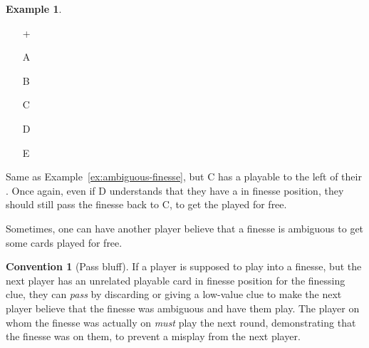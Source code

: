 \documentclass[a4paper]{article}
\theoremstyle{plain}
\theoremstyle{definition}
\newtheorem{example}[theorem]{Example}
\newtheorem{convention}[theorem]{Convention}
\begin{document}
\begin{example}	\hfill \\
	\begin{minipage}{0.45\textwidth}
		\begin{itemize}
			\item[\Large +]      
			\item[\Large A]    
			\item[\Large B]    
			\item[\Large C]     
			\item[\Large D]    
			\item[\Large E]    
		\end{itemize}
	\end{minipage}%
	\begin{minipage}{0.55\textwidth}
		\label{ex:layered-ambiguous-finesse}
		Same as Example~\ref{ex:ambiguous-finesse}, but C has a playable  to the left of their . Once again, even if D understands that they have a  in finesse position, they should still pass the finesse back to C, to get the  played for free.
	\end{minipage}
\end{example} \vspace{0.15 cm}

Sometimes, one can have another player believe that a finesse is ambiguous to get some cards played for free.

\begin{convention}[Pass bluff]
	If a player is supposed to play into a finesse, but the next player has an unrelated playable card in finesse position for the finessing clue, they can \emph{pass} by discarding or giving a low-value clue to make the next player believe that the finesse was ambiguous and have them play. The player on whom the finesse was actually on \emph{must} play the next round, demonstrating that the finesse was on them, to prevent a misplay from the next player.
\end{convention}
\end{document}
